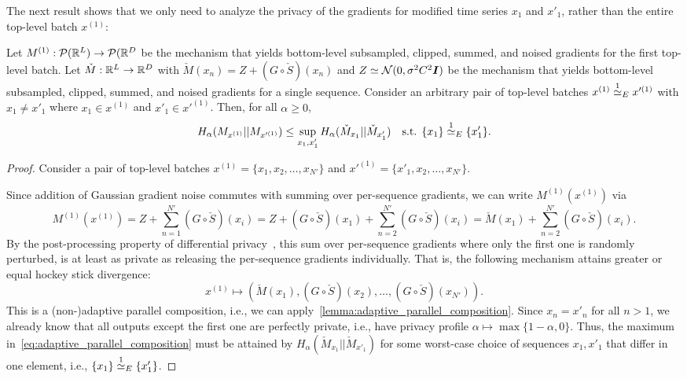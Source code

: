 The next result shows that we only need to analyze the privacy of the gradients for modified time series $x_1$ and $x'_1$, rather than the entire top-level batch $x^{(1)}$:
\begin{lemma}\label{lemma:proofs_bottom_step_to_group}
    Let $M^{(1)} : \mathcal{P}({\mathbb{R}}^{L}) \rightarrow \mathcal{P}({\mathbb{R}}^{D}$ be the mechanism that yields bottom-level subsampled, clipped, summed, and noised gradients for the first top-level batch.
    Let $\check{M} : {\mathbb{R}}^{L} \rightarrow {\mathbb{R}}^{D}$
    with $\check{M}(x_n)  = Z + (G \circ \check{S})(x_n)$ and $Z \simeq \mathcal{N}(0, \sigma^2 C^2 {\bm{I}})$
    be the mechanism that yields bottom-level subsampled, clipped, summed, and noised gradients for a single sequence.
    Consider an arbitrary pair of top-level batches $x^{(1)} \overset{1}{\simeq}_{E} x'^{(1)}$
    with $x_1 \neq x'_1$ where $x_1 \in x^{(1)}$ and $x'_1 \in x'^{(1)}$.
    Then, for all $\alpha \geq 0$,
    \begin{equation*}
        H_\alpha(M_{x^{(1)}} || M_{x'^{(1)}}) \leq \sup_{x_1, x'_1} H_\alpha(\check{M}_{x_1} || \check{M}_{x'_1})
        \quad \text{s.t. } \{x_1\} \overset{1}{\simeq}_{E} \{x'_1\}.
    \end{equation*}
\end{lemma}
\begin{proof}
    Consider a pair of top-level batches $x^{(1)} = \{x_1,x_2,\dots,x_{N'}\}$ and $x'^{(1)} = \{x'_1,x_2,\dots,x_{N'}\}$.
    
    Since addition of Gaussian gradient noise commutes with summing over per-sequence gradients, we can write
    $M^{(1)}(x^{(1)})$ via
    \begin{equation*}
        M^{(1)}(x^{(1)}) = Z + \sum_{n=1}^{N'} (G \circ \check{S})(x_i)
                         = Z + (G \circ \check{S})(x_1) + \sum_{n=2}^{N'} (G \circ \check{S})(x_i)
                         = \check{M}(x_1) + \sum_{n=2}^{N'} (G \circ \check{S})(x_i).
    \end{equation*}
    By the post-processing property of differential privacy~\cite{dwork2006differential,dong2022gaussian},
    this sum over per-sequence gradients where only the first one is randomly perturbed,  is at least as private as releasing the per-sequence gradients individually. That is, 
    the following mechanism attains greater or equal hockey stick divergence:
    \begin{equation*}
        x^{(1)} \mapsto \left(\check{M}(x_1), (G \circ \check{S})(x_2),\dots,(G \circ \check{S})(x_{N'})  \right).
    \end{equation*}
    This is a (non-)adaptive parallel composition, i.e., we can apply~\cref{lemma:adaptive_parallel_composition}.
    Since $x_n = x'_n$ for all $n > 1$, we already know that all outputs except the first one are perfectly private,
    i.e., have privacy profile $\alpha \mapsto \max \{ 1 - \alpha, 0\}$.
    Thus, the maximum in~\cref{eq:adaptive_parallel_composition} must be attained by $H_\alpha(\check{M}_{x_1} || \check{M}_{x'_1})$
    for some worst-case choice of  sequences $x_1, x'_1$ that differ in one element, i.e., $\{x_1\} \overset{1}{\simeq}_{E} \{x'_1\}$.
\end{proof}

